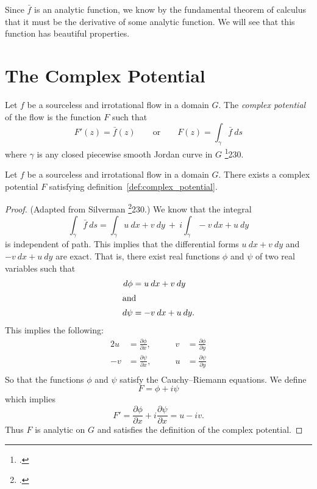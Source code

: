 \documentclass[letterpaper, twoside, 12 pt]{article}
\begin{document}
	Since $\bar f$ is an analytic function, we know by the fundamental theorem of calculus that it must be the derivative of some analytic function.
	We will see that this function has beautiful properties.

\section{The Complex Potential} %
	\label{sec:complex_potential}

	\begin{definition}
	\label{def:complex_potential}
		Let $f$ be a sourceless and irrotational flow in a domain $G$.
		The \textit{complex potential} of the flow is the function $F$ such that
		\[
			F'(z) = \bar f(z) \qquad \text{or} \qquad F(z) = \int_\gamma  \bar f \ ds
		\]
		where $\gamma$ is any closed piecewise smooth Jordan curve in $G$ \footcite{silverman}{230}.
	\end{definition}

	\begin{theorem}
		Let $f$ be a sourceless and irrotational flow in a domain $G$. 
		There exists a complex potential $F$ satisfying definition~\ref{def:complex_potential}.
	\end{theorem}
	\begin{proof}
		(Adapted from Silverman \footcite{silverman}{230}.)
		We know that the integral
		\[
			\int_\gamma \bar f \ ds = \int_\gamma u\> dx + v\> dy \ + \ i \! \int_\gamma -v \> dx + u \> dy
		\]
		is independent of path.
		This implies that the differential forms $u\> dx + v\> dy$ and $-v\> dx + u\> dy$ are exact.
		That is, there exist real functions $\phi$ and $\psi$ of two real variables such that 
		\begin{align*}
			d \phi &= u\> dx + v\> dy \\
			\intertext{and}
			d \psi &= -v\> dx + u\> dy.
		\end{align*}
		This implies the following:
		\begin{alignat*}{2}
			u &= \frac{\partial \phi}{\partial x},  \qquad	& v &= \frac{\partial \phi}{\partial y} \\[1 em]
			-v &= \frac{\partial \psi}{\partial x}, \qquad	& u &= \frac{\partial \psi}{\partial y} \\
		\end{alignat*}
		So that the functions $\phi$ and $\psi$ satisfy the Cauchy--Riemann equations.
		We define 
		\[
			F = \phi + i \psi
		\]
		which implies
		\[
			F' = \frac{\partial \phi}{\partial x} + i \frac{\partial \psi}{\partial x} = u - iv.
		\]
		Thus $F$ is analytic on $G$ and satisfies the definition of the complex potential.
	\end{proof}
\end{document}
